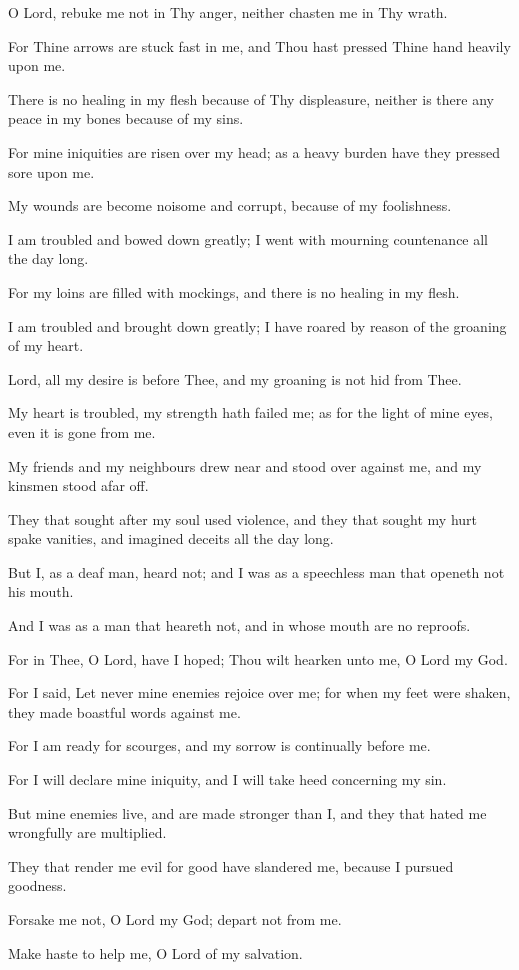 O Lord, rebuke me not in Thy anger, neither chasten me in Thy wrath.

For Thine arrows are stuck fast in me, and Thou hast pressed Thine hand heavily upon me.

There is no healing in my flesh because of Thy displeasure, neither is there any peace in my bones because of my sins.

For mine iniquities are risen over my head; as a heavy burden have they pressed sore upon me.

My wounds are become noisome and corrupt, because of my foolishness.

I am troubled and bowed down greatly; I went with mourning countenance all the day long.

For my loins are filled with mockings, and there is no healing in my flesh.

I am troubled and brought down greatly; I have roared by reason of the groaning of my heart.

Lord, all my desire is before Thee, and my groaning is not hid from Thee.

My heart is troubled, my strength hath failed me; as for the light of mine eyes, even it is gone from me.

My friends and my neighbours drew near and stood over against me, and my kinsmen stood afar off.

They that sought after my soul used violence, and they that sought my hurt spake vanities, and imagined deceits all the day long.

But I, as a deaf man, heard not; and I was as a speechless man that openeth not his mouth.

And I was as a man that heareth not, and in whose mouth are no reproofs.

For in Thee, O Lord, have I hoped; Thou wilt hearken unto me, O Lord my God.

For I said, Let never mine enemies rejoice over me; for when my feet were shaken, they made boastful words against me.

For I am ready for scourges, and my sorrow is continually before me.

For I will declare mine iniquity, and I will take heed concerning my sin.

But mine enemies live, and are made stronger than I, and they that hated me wrongfully are multiplied.

They that render me evil for good have slandered me, because I pursued goodness.

Forsake me not, O Lord my God; depart not from me.

Make haste to help me, O Lord of my salvation.
